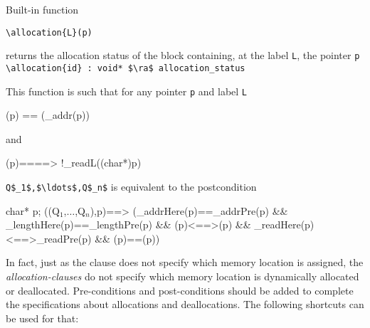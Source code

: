 Built-in function
\begin{notimplementedenv}\lstinline|\allocation{L}(p)|\end{notimplementedenv}%
returns the allocation status of the block containing, at the label 
\lstinline|L|, the pointer \lstinline|p| 
\\ \makebox[5mm]{} \lstinline|\allocation{id} : void* $\ra$ allocation_status|

This function is such that for any pointer \lstinline|p| and label \lstinline|L|
\begin{listing-nonumber}
(p) == (\base_addr(p))
\end{listing-nonumber}
and
\begin{listing-nonumber}
(p)==\unallocated ==> !\valid_read{L}((char*)p)
\end{listing-nonumber}

\allocates \lstinline|Q$_1$,$\ldots$,Q$_n$| is equivalent to the postcondition
\begin{listing-nonumber}
\forall char* p; 
\separated(\union(Q$_1$,$\ldots$,Q$_n$),p)==>
     (\base_addr{Here}(p)==\base_addr{Pre}(p)
      && \block_length{Here}(p)==\block_length{Pre}(p)
      && (p)<==>(p)
      && \valid_read{Here}(p)<==>\valid_read{Pre}(p)
      && (p)==(p))
\end{listing-nonumber}

In fact, just as the \assigns clause does not specify which memory location is
assigned,
the \textsl{allocation-clauses} do not specify which memory location 
is dynamically allocated or deallocated.
Pre-conditions and post-conditions should be added to complete the specifications
about allocations and deallocations.
The following shortcuts can be used for that:

